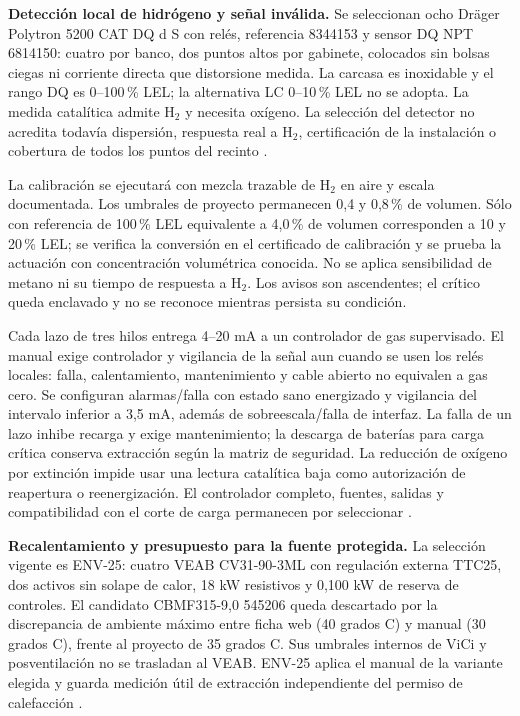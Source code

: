\textbf{Detección local de hidrógeno y señal inválida.} Se seleccionan ocho Dräger Polytron 5200 CAT DQ d S con relés, referencia 8344153 y sensor DQ NPT 6814150: cuatro por banco, dos puntos altos por gabinete, colocados sin bolsas ciegas ni corriente directa que distorsione medida. La carcasa es inoxidable y el rango DQ es 0--100\,\% LEL; la alternativa LC 0--10\,\% LEL no se adopta. La medida catalítica admite H$_2$ y necesita oxígeno. La selección del detector no acredita todavía dispersión, respuesta real a H$_2$, certificación de la instalación o cobertura de todos los puntos del recinto \parencite{lote22-polytron-pi,lote22-polytron-ifu}.

La calibración se ejecutará con mezcla trazable de H$_2$ en aire y escala documentada. Los umbrales de proyecto permanecen 0,4 y 0,8\,\% de volumen. Sólo con referencia de 100\,\% LEL equivalente a 4,0\,\% de volumen corresponden a 10 y 20\,\% LEL; se verifica la conversión en el certificado de calibración y se prueba la actuación con concentración volumétrica conocida. No se aplica sensibilidad de metano ni su tiempo de respuesta a H$_2$. Los avisos son ascendentes; el crítico queda enclavado y no se reconoce mientras persista su condición.

Cada lazo de tres hilos entrega 4--20 mA a un controlador de gas supervisado. El manual exige controlador y vigilancia de la señal aun cuando se usen los relés locales: falla, calentamiento, mantenimiento y cable abierto no equivalen a gas cero. Se configuran alarmas/falla con estado sano energizado y vigilancia del intervalo inferior a 3,5 mA, además de sobreescala/falla de interfaz. La falla de un lazo inhibe recarga y exige mantenimiento; la descarga de baterías para carga crítica conserva extracción según la matriz de seguridad. La reducción de oxígeno por extinción impide usar una lectura catalítica baja como autorización de reapertura o reenergización. El controlador completo, fuentes, salidas y compatibilidad con el corte de carga permanecen por seleccionar \parencite[secs.~3.3, 8, 11 y 15]{lote22-polytron-ifu}.

\textbf{Recalentamiento y presupuesto para la fuente protegida.} La selección vigente es ENV-25: cuatro VEAB CV31-90-3ML con regulación externa TTC25, dos activos sin solape de calor, 18 kW resistivos y 0,100 kW de reserva de controles. El candidato CBMF315-9,0 545206 queda descartado por la discrepancia de ambiente máximo entre ficha web (40 grados C) y manual (30 grados C), frente al proyecto de 35 grados C. Sus umbrales internos de ViCi y posventilación no se trasladan al VEAB. ENV-25 aplica el manual de la variante elegida y guarda medición útil de extracción independiente del permiso de calefacción \parencite{lote22-cbmf-web,lote22-cbmf-manual}.

